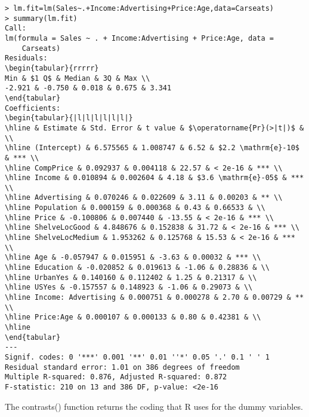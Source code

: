 \documentclass[10pt]{article}
\begin{document}
\begin{verbatim}
> lm.fit=lm(Sales~.+Income:Advertising+Price:Age,data=Carseats)
> summary(lm.fit)
Call:
lm(formula = Sales ~ . + Income:Advertising + Price:Age, data =
    Carseats)
Residuals:
\begin{tabular}{rrrrr} 
Min & $1 Q$ & Median & 3Q & Max \\
-2.921 & -0.750 & 0.018 & 0.675 & 3.341
\end{tabular}
Coefficients:
\begin{tabular}{|l|l|l|l|l|l|}
\hline & Estimate & Std. Error & t value & $\operatorname{Pr}(>|t|)$ & \\
\hline (Intercept) & 6.575565 & 1.008747 & 6.52 & $2.2 \mathrm{e}-10$ & *** \\
\hline CompPrice & 0.092937 & 0.004118 & 22.57 & < 2e-16 & *** \\
\hline Income & 0.010894 & 0.002604 & 4.18 & $3.6 \mathrm{e}-05$ & *** \\
\hline Advertising & 0.070246 & 0.022609 & 3.11 & 0.00203 & ** \\
\hline Population & 0.000159 & 0.000368 & 0.43 & 0.66533 & \\
\hline Price & -0.100806 & 0.007440 & -13.55 & < 2e-16 & *** \\
\hline ShelveLocGood & 4.848676 & 0.152838 & 31.72 & < 2e-16 & *** \\
\hline ShelveLocMedium & 1.953262 & 0.125768 & 15.53 & < 2e-16 & *** \\
\hline Age & -0.057947 & 0.015951 & -3.63 & 0.00032 & *** \\
\hline Education & -0.020852 & 0.019613 & -1.06 & 0.28836 & \\
\hline UrbanYes & 0.140160 & 0.112402 & 1.25 & 0.21317 & \\
\hline USYes & -0.157557 & 0.148923 & -1.06 & 0.29073 & \\
\hline Income: Advertising & 0.000751 & 0.000278 & 2.70 & 0.00729 & ** \\
\hline Price:Age & 0.000107 & 0.000133 & 0.80 & 0.42381 & \\
\hline
\end{tabular}
---
Signif. codes: 0 '***' 0.001 '**' 0.01 ''*' 0.05 '.' 0.1 ' ' 1
Residual standard error: 1.01 on 386 degrees of freedom
Multiple R-squared: 0.876, Adjusted R-squared: 0.872
F-statistic: 210 on 13 and 386 DF, p-value: <2e-16
\end{verbatim}

The contrasts() function returns the coding that R uses for the dummy variables.
\end{document}
